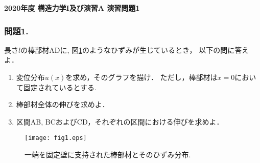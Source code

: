 \documentclass[10pt,a4j]{jarticle}
\newlength{\minitwocolumn}
\begin{document}
\newcommand{\fat}[1]{\mbox{\boldmath $#1$}}
\newcommand{\D}{\partial}
\newcommand{\w}{\omega}
\newcommand{\ga}{\alpha}
\newcommand{\gb}{\beta}
\newcommand{\gx}{\xi}
\newcommand{\gz}{\zeta}
\newcommand{\vhat}[1]{\hat{\fat{#1}}}
\newcommand{\spc}{\vspace{0.7\baselineskip}}
\newcommand{\halfspc}{\vspace{0.3\baselineskip}}

\pagestyle{empty}
\newcommand{\twofig}[2]
 {
   \begin{figure}
     \begin{minipage}[t]{\minitwocolumn}
         \begin{center}   #1
         \end{center}
     \end{minipage}
         \hspace{\columnsep}
     \begin{minipage}[t]{\minitwocolumn}
         \begin{center} #2
         \end{center}
     \end{minipage}
   \end{figure}
 }
\begin{center}
	{\Large \bf 2020年度 構造力学I及び演習A 演習問題1} \\
\end{center}
\subsubsection*{問題1.}
長さ$l$の棒部材ADに, 図\ref{fig:fig1}のようなひずみが生じているとき，
以下の問に答えよ．
\begin{enumerate}
\item
	変位分布$u(x)$を求め，そのグラフを描け．
	ただし，棒部材は$x=0$において固定されているとする.
\item
	棒部材全体の伸びを求めよ．
\item
	区間AB, BCおよびCD，それぞれの区間における伸びを求めよ．
\end{enumerate}
\begin{figure}[h]
	\vspace{-3mm}
	\begin{center}
	\texttt{[image: fig1.eps]} 
	\end{center}
	\vspace{-5mm}
	\caption{一端を固定壁に支持された棒部材とそのひずみ分布.} 
	\label{fig:fig1}
\end{figure}
	\vspace{-5mm}
\end{document}
